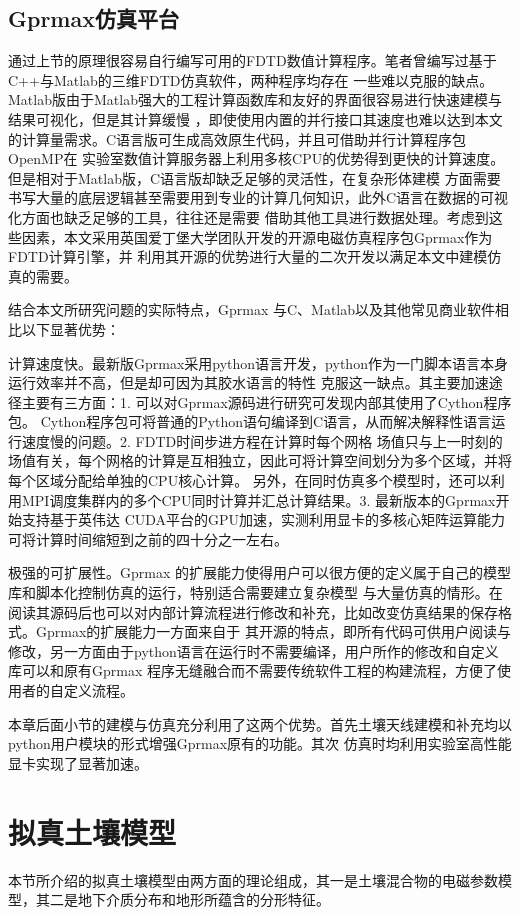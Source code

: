 \subsection{Gprmax仿真平台}
通过上节的原理很容易自行编写可用的FDTD数值计算程序。笔者曾编写过基于C++与Matlab的三维FDTD仿真软件，两种程序均存在
一些难以克服的缺点。Matlab版由于Matlab强大的工程计算函数库和友好的界面很容易进行快速建模与结果可视化，但是其计算缓慢
，即使使用内置的并行接口其速度也难以达到本文的计算量需求。C语言版可生成高效原生代码，并且可借助并行计算程序包OpenMP在
实验室数值计算服务器上利用多核CPU的优势得到更快的计算速度。但是相对于Matlab版，C语言版却缺乏足够的灵活性，在复杂形体建模
方面需要书写大量的底层逻辑甚至需要用到专业的计算几何知识，此外C语言在数据的可视化方面也缺乏足够的工具，往往还是需要
借助其他工具进行数据处理。考虑到这些因素，本文采用英国爱丁堡大学团队开发的开源电磁仿真程序包Gprmax作为FDTD计算引擎，并
利用其开源的优势进行大量的二次开发以满足本文中建模仿真的需要。

结合本文所研究问题的实际特点，Gprmax 与C、Matlab以及其他常见商业软件相比以下显著优势：

计算速度快。最新版Gprmax采用python语言开发，python作为一门脚本语言本身运行效率并不高，但是却可因为其胶水语言的特性
克服这一缺点。其主要加速途径主要有三方面：1. 可以对Gprmax源码进行研究可发现内部其使用了Cython程序包。
Cython程序包可将普通的Python语句编译到C语言，从而解决解释性语言运行速度慢的问题。2. FDTD时间步进方程在计算时每个网格
场值只与上一时刻的场值有关，每个网格的计算是互相独立，因此可将计算空间划分为多个区域，并将每个区域分配给单独的CPU核心计算。
另外，在同时仿真多个模型时，还可以利用MPI调度集群内的多个CPU同时计算并汇总计算结果。3. 最新版本的Gprmax开始支持基于英伟达
CUDA平台的GPU加速，实测利用显卡的多核心矩阵运算能力可将计算时间缩短到之前的四十分之一左右。

极强的可扩展性。Gprmax 的扩展能力使得用户可以很方便的定义属于自己的模型库和脚本化控制仿真的运行，特别适合需要建立复杂模型
与大量仿真的情形。在阅读其源码后也可以对内部计算流程进行修改和补充，比如改变仿真结果的保存格式。Gprmax的扩展能力一方面来自于
其开源的特点，即所有代码可供用户阅读与修改，另一方面由于python语言在运行时不需要编译，用户所作的修改和自定义库可以和原有Gprmax
程序无缝融合而不需要传统软件工程的构建流程，方便了使用者的自定义流程。

本章后面小节的建模与仿真充分利用了这两个优势。首先土壤天线建模和补充均以python用户模块的形式增强Gprmax原有的功能。其次
仿真时均利用实验室高性能显卡实现了显著加速。

\section{拟真土壤模型}
本节所介绍的拟真土壤模型由两方面的理论组成，其一是土壤混合物的电磁参数模型，其二是地下介质分布和地形所蕴含的分形特征。
